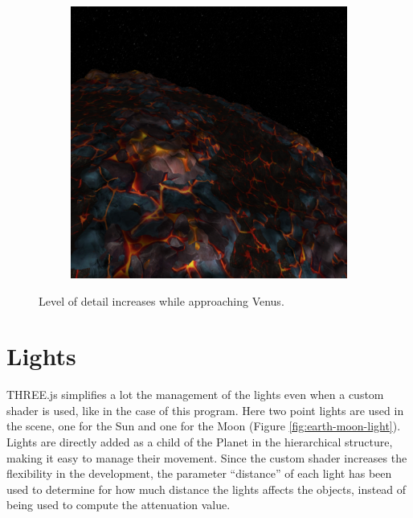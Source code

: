 \documentclass[paper=a4, fontsize=11pt]{scrartcl} %
\numberwithin{equation}{section} %
\numberwithin{figure}{section} %
\numberwithin{table}{section} %
\theoremstyle{definition}
\begin{document}
\begin{figure}
\begin{subfigure}{.3\textwidth}
	\end{subfigure}
	\begin{subfigure}{.3\textwidth}
		\centering
		\includegraphics[width=1.0\linewidth]{images/venus_d2.png}
	\end{subfigure}
	\caption{Level of detail increases while approaching Venus.}
	\label{fig:LOD-venus}
\end{figure}


\section{Lights}

THREE.js simplifies a lot the management of the lights even when a custom
shader is used, like in the case of this program. Here two point lights are used
in the scene, one for the Sun and one for the Moon (Figure \ref{fig:earth-moon-light}). Lights are directly added
as a child of the Planet in the hierarchical structure, making it easy to
manage their movement. Since the custom shader increases the flexibility in
the development,
the parameter ``distance'' of each light has been used to determine for how much
distance the lights affects the objects, instead of being used to compute the
attenuation value.
\end{document}
